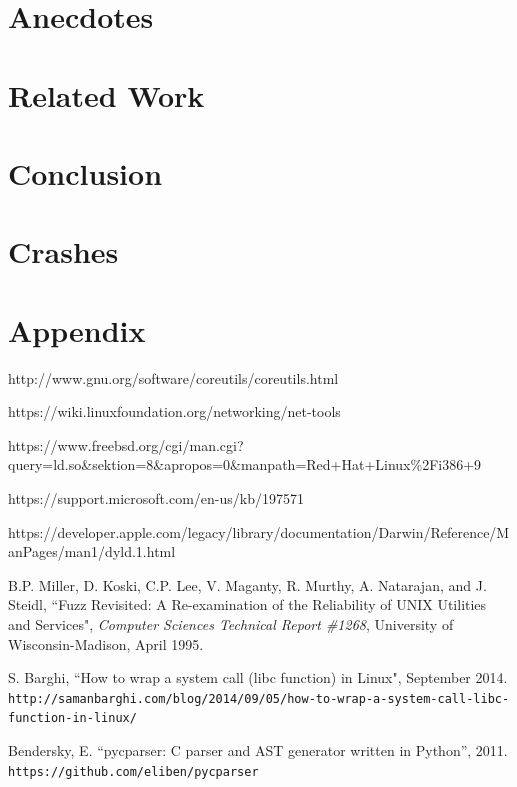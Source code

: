 \documentclass[10pt]{article}
\begin{document}
\section{Anecdotes}

\section{Related Work}

\section{Conclusion}

\section{Crashes}


\section*{Appendix}

\begin{thebibliography}{9}
	http://www.gnu.org/software/coreutils/coreutils.html
	
	https://wiki.linuxfoundation.org/networking/net-tools
	
	https://www.freebsd.org/cgi/man.cgi?query=ld.so\&sektion=8\&apropos=0\&manpath=Red+Hat+Linux\%2Fi386+9
	
	https://support.microsoft.com/en-us/kb/197571
	
	https://developer.apple.com/legacy/library/documentation/Darwin/Reference/ManPages/man1/dyld.1.html
	
	B.P. Miller, D. Koski, C.P. Lee, V. Maganty, R. Murthy, A. Natarajan, and J. Steidl, ``Fuzz Revisited: A Re-examination of the Reliability of UNIX Utilities and Services", \textit{Computer Sciences Technical Report \#1268}, University of Wisconsin-Madison, April 1995.
	
	S. Barghi, ``How to wrap a system call (libc function) in Linux", September 2014.\\
	\texttt{http://samanbarghi.com/blog/2014/09/05/how-to-wrap-a-system-call-libc-function-in-linux/}
	
	Bendersky, E. ``pycparser: C parser and AST generator written in Python'', 2011.\\
	\texttt{https://github.com/eliben/pycparser}
\end{thebibliography}
\end{document}
